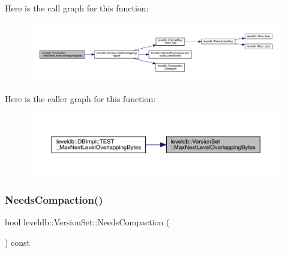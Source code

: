 Here is the call graph for this function\+:
\nopagebreak
\begin{figure}[H]
\begin{center}
\leavevmode
\includegraphics[width=350pt]{classleveldb_1_1_version_set_a32dc1a7e1eaeeeac89286be3483ad612_cgraph}
\end{center}
\end{figure}
Here is the caller graph for this function\+:
\nopagebreak
\begin{figure}[H]
\begin{center}
\leavevmode
\includegraphics[width=350pt]{classleveldb_1_1_version_set_a32dc1a7e1eaeeeac89286be3483ad612_icgraph}
\end{center}
\end{figure}
\mbox{\label{classleveldb_1_1_version_set_a5a8a8a80e14a141672c7fdc9c7dd7328}} 
\subsubsection{\texorpdfstring{NeedsCompaction()}{NeedsCompaction()}}
{\footnotesize\ttfamily bool leveldb\+::\+Version\+Set\+::\+Needs\+Compaction (\begin{DoxyParamCaption}{ }\end{DoxyParamCaption}) const\hspace{0.3cm}{\ttfamily [inline]}}

\mbox{\label{classleveldb_1_1_version_set_ac4086c848479e74c1d9eb95e250e7167}} 
